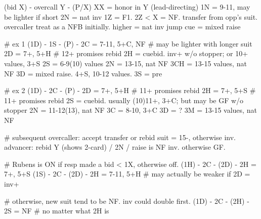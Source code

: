 (bid X) - overcall Y - (P/X)
XX = honor in Y (lead-directing)
1N = 9-11, may be lighter if short
2N = nat inv
1Z = F1. 2Z < X = NF.
transfer from opp's suit. overcaller treat as a NFB initially.
higher = nat inv
jump cue = mixed raise

# ex 1
(1D) - 1S - (P) - 
2C = 7-11, 5+C, NF  # may be lighter with longer suit
2D = 7+, 5+H  # 12+ promises rebid
2H = cuebid. inv+ w/o stopper; or 10+ values, 3+S
2S = 6-9(10) values
2N = 13-15, nat NF
3CH = 13-15 values, nat NF
3D = mixed raise. 4+S, 10-12 values.
3S = pre

# ex 2
(1D) - 2C - (P) -
2D = 7+, 5+H  # 11+ promises rebid
2H = 7+, 5+S  # 11+ promises rebid
2S = cuebid. usually (10)11+, 3+C; but may be GF w/o stopper 
2N = 11-12(13), nat NF
3C = 8-10, 3+C
3D = ?
3M = 13-15 values, nat NF

# subsequent
overcaller: accept transfer or rebid suit = 15-, otherwise inv.
advancer: rebid Y (shows 2-card) / 2N / raise is NF inv. otherwise GF.

# Rubens is ON if resp made a bid < 1X, otherwise off.
(1H) - 2C - (2D) - 2H = 7+, 5+S
(1S) - 2C - (2D) - 2H = 7-11, 5+H  # may actually be weaker if 2D = inv+

# otherwise, new suit tend to be NF. inv could double first.
(1D) - 2C - (2H) - 2S = NF  # no matter what 2H is